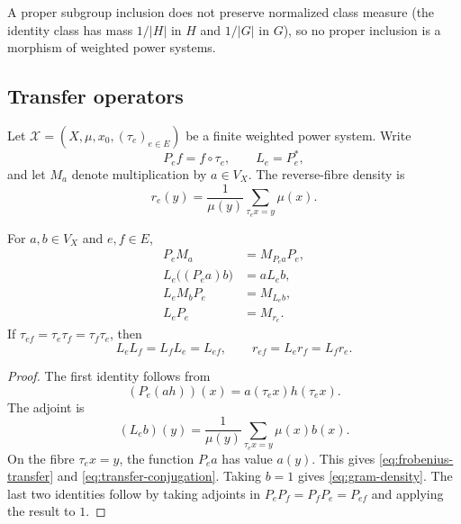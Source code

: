 A proper subgroup inclusion does not preserve normalized class measure
(the identity class has mass \(1/|H|\) in \(H\) and \(1/|G|\) in \(G\)),
so no proper inclusion is a morphism of weighted power systems.

\subsection{Transfer operators}
\label{sec:transfer}

Let \(\mathscr X=(X,\mu,x_0,(\tau_e)_{e\in E})\) be a finite weighted
power system.  Write
\[
 P_ef=f\circ\tau_e,\qquad L_e=P_e^*,
\]
and let \(M_a\) denote multiplication by \(a\in V_X\).  The reverse-fibre
density is
\begin{equation}
 r_e(y)=\frac{1}{\mu(y)}
 \sum_{\tau_ex=y}\mu(x).
 \label{eq:reverse-fibre-density}
\end{equation}

\begin{theorem}
\label{thm:transfer-calculus}
For \(a,b\in V_X\) and \(e,f\in E\),
\begin{align}
 P_eM_a&=M_{P_ea}P_e,                         \label{eq:covariance}\\
 L_e\bigl((P_ea)b\bigr)&=aL_eb,               \label{eq:frobenius-transfer}\\
 L_eM_bP_e&=M_{L_eb},                         \label{eq:transfer-conjugation}\\
 L_eP_e&=M_{r_e}.                             \label{eq:gram-density}
\end{align}
If \(\tau_{ef}=\tau_e\tau_f=\tau_f\tau_e\), then
\begin{equation}
 L_eL_f=L_fL_e=L_{ef},\qquad
 r_{ef}=L_er_f=L_fr_e.
 \label{eq:density-cocycle}
\end{equation}
\end{theorem}

\begin{proof}
The first identity follows from
\[
 (P_e(ah))(x)=a(\tau_ex)h(\tau_ex).
\]
The adjoint is
\begin{equation}
 (L_eb)(y)=\frac{1}{\mu(y)}
 \sum_{\tau_ex=y}\mu(x)b(x).
 \label{eq:explicit-transfer}
\end{equation}
On the fibre \(\tau_ex=y\), the function \(P_ea\) has value \(a(y)\).
This gives \eqref{eq:frobenius-transfer} and
\eqref{eq:transfer-conjugation}.  Taking \(b=1\) gives
\eqref{eq:gram-density}.  The last two identities follow by taking
adjoints in \(P_eP_f=P_fP_e=P_{ef}\) and applying the result to \(1\).
\end{proof}

